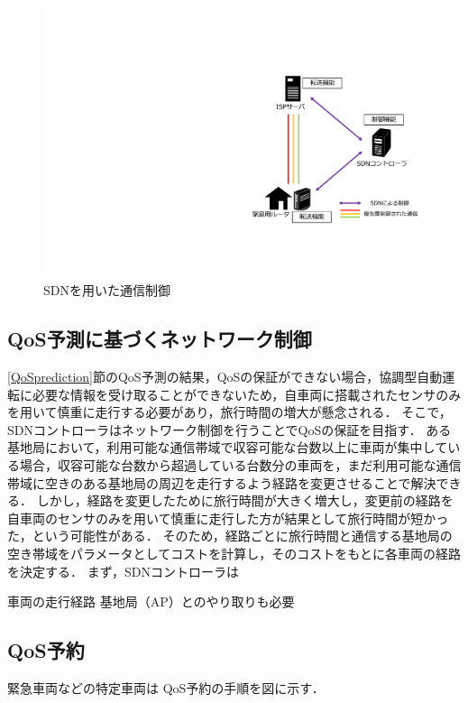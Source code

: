 \documentclass[a4paper,10pt,twocolumn,uplatex]{jsarticle}
\begin{document}
\begin{figure}[t]
	\begin{centering}
    \includegraphics[width=0.7\linewidth]{img/proposal_resume.pdf}
    \caption{SDNを用いた通信制御}
    \label{fig:proposal}
    \end{centering}
\end{figure}

\subsection{QoS予測に基づくネットワーク制御}
\label{priority}
\ref{QoSprediction}節のQoS予測の結果，QoSの保証ができない場合，協調型自動運転に必要な情報を受け取ることができないため，自車両に搭載されたセンサのみを用いて慎重に走行する必要があり，旅行時間の増大が懸念される．
そこで，SDNコントローラはネットワーク制御を行うことでQoSの保証を目指す．
ある基地局において，利用可能な通信帯域で収容可能な台数以上に車両が集中している場合，収容可能な台数から超過している台数分の車両を，まだ利用可能な通信帯域に空きのある基地局の周辺を走行するよう経路を変更させることで解決できる．
しかし，経路を変更したために旅行時間が大きく増大し，変更前の経路を自車両のセンサのみを用いて慎重に走行した方が結果として旅行時間が短かった，という可能性がある．
そのため，経路ごとに旅行時間と通信する基地局の空き帯域をパラメータとしてコストを計算し，そのコストをもとに各車両の経路を決定する．
まず，SDNコントローラは

車両の走行経路
基地局（AP）とのやり取りも必要

\subsection{QoS予約}
緊急車両などの特定車両は
QoS予約の手順を図に示す．
\end{document}
